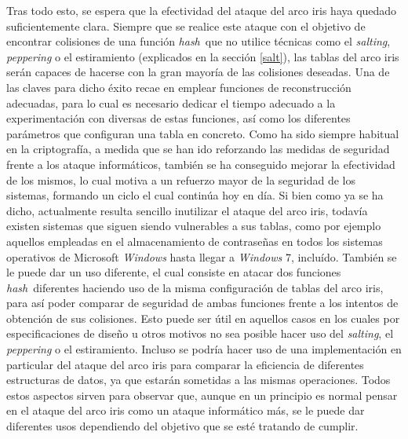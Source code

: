 \documentclass[12pt,spanish,listoffigures,listoftables,listofalgorithms]{tfgetsinf}
\newcommand{\hash}{\textit{hash}}
\begin{document}
Tras todo esto, se espera que la efectividad del ataque del arco iris haya quedado suficientemente clara. Siempre que se realice este ataque con el objetivo de encontrar colisiones de una función \hash~que no utilice técnicas como el \textit{salting}, \textit{peppering} o el estiramiento (explicados en la sección \ref{salt}), las tablas del arco iris serán capaces de hacerse con la gran mayoría de las colisiones deseadas. Una de las claves para dicho éxito recae en emplear funciones de reconstrucción adecuadas, para lo cual es necesario dedicar el tiempo adecuado a la experimentación con diversas de estas funciones, así como los diferentes parámetros que configuran una tabla en concreto. Como ha sido siempre habitual en la criptografía, a medida que se han ido reforzando las medidas de seguridad frente a los ataque informáticos, también se ha conseguido mejorar la efectividad de los mismos, lo cual motiva a un refuerzo mayor de la seguridad de los sistemas, formando un ciclo el cual continúa hoy en día. Si bien como ya se ha dicho, actualmente resulta sencillo inutilizar el ataque del arco iris, todavía existen sistemas que siguen siendo vulnerables a sus tablas, como por ejemplo aquellos empleadas en el almacenamiento de contraseñas en todos los sistemas operativos de Microsoft \textit{Windows} hasta llegar a \textit{Windows} 7, incluído. También  se le puede dar un uso diferente, el cual consiste en atacar dos funciones \hash~diferentes haciendo uso de la misma configuración de tablas del arco iris, para así poder comparar de seguridad de ambas funciones frente a los intentos de obtención de sus colisiones. Esto puede ser útil en aquellos casos en los cuales por especificaciones de diseño u otros motivos no sea posible hacer uso del \textit{salting}, el \textit{peppering} o el estiramiento. Incluso se podría hacer uso de una implementación en particular del ataque del arco iris para comparar la eficiencia de diferentes estructuras de datos, ya que estarán sometidas a las mismas operaciones. Todos estos aspectos sirven para observar que, aunque en un principio es normal pensar en el ataque del arco iris como un ataque informático más, se le puede dar diferentes usos dependiendo del objetivo que se esté tratando de cumplir.




\end{document}

